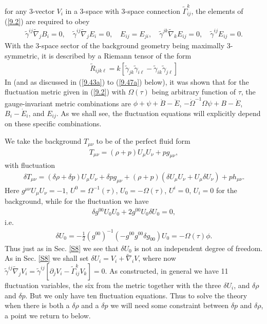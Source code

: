 \documentclass[aps,onecolumn,10pt]{revtex4}
\numberwithin{equation}{section}
\numberwithin{equation}{section}
\begin{document}
%
for any 3-vector $V_i$ in a 3-space with 3-space connection $\tilde{\Gamma}^{k}_{ij}$, the elements of (\ref{9.2}) are required to obey
%
\begin{eqnarray}
\tilde{\gamma}^{ij}\tilde{\nabla}_j B_i = 0,\quad \tilde{\gamma}^{ij}\tilde{\nabla}_j E_i = 0, \quad E_{ij}=E_{ji},\quad \tilde{\gamma}^{jk}\tilde{\nabla}_kE_{ij} = 0, \quad\tilde{\gamma}^{ij}E_{ij} = 0.
\label{9.4}
\end{eqnarray}
%
With the  3-space sector of the background geometry being maximally 3-symmetric, it is described by a Riemann tensor of the form
%
\begin{eqnarray}
\tilde{R}_{ijk\ell}=k[\tilde{\gamma}_{jk}\tilde{\gamma}_{i\ell}-\tilde{\gamma}_{ik}\tilde{\gamma}_{j\ell}]
\label{9.5}
\end{eqnarray}
%
In \cite{Amarasinghe2018} (and as discussed in (\ref{9.43a}) to (\ref{9.47a}) below), it was shown that for the fluctuation metric given in (\ref{9.2}) with $\Omega(\tau)$ being arbitrary function of $\tau$, the gauge-invariant metric combinations are $\phi + \psi + \dot B - \ddot E$, $ - \dot\Omega^{-1}\Omega \psi + B - \dot E$, $B_i-\dot{E}_i$, and $E_{ij}$. As we shall see, the fluctuation equations will explicitly depend on these specific combinations.



We take the background $T_{\mu\nu}$ to be of the perfect fluid form
%
\begin{eqnarray}
T_{\mu\nu}=(\rho+p)U_{\mu}U_{\nu}+pg_{\mu\nu},
\label{9.6}
\end{eqnarray}
%
with fluctuation
%
\begin{eqnarray}
\delta T_{\mu\nu}=(\delta\rho+\delta p)U_{\mu}U_{\nu}+\delta pg_{\mu\nu}+(\rho+p)(\delta U_{\mu}U_{\nu}+U_{\mu}\delta U_{\nu})+ph_{\mu\nu}.
\label{9.7}
\end{eqnarray}
%
Here  $g^{\mu\nu}U_{\mu}U_{\nu}=-1$, $U^{0}=\Omega^{-1}(\tau)$, $U_0=-\Omega(\tau)$, $U^{i}=0$, $U_i=0$ for the background, while for the fluctuation we have 
%
\begin{eqnarray}
 \delta g^{00}U_{0}U_{0}+2g^{00}U_{0}\delta U_{0}=0,
\label{9.8}
\end{eqnarray}
%
i.e. 
%
\begin{eqnarray}
\delta U_{0}=-\frac{1}{2}(g^{00})^{-1}(-g^{00}g^{00}\delta g_{00})U_{0}=-\Omega(\tau)\phi.
\label{9.9}
\end{eqnarray}
%
Thus just as in Sec. \ref{S8} we see that $\delta U_0$ is not an independent degree of freedom. As in Sec. \ref{S8} we shall set $\delta U_i=V_i+\tilde{\nabla}_iV$, where now $\tilde{\gamma}^{ij}\tilde{\nabla}_j V_i=\tilde{\gamma}^{ij}[\partial_j V_i-\tilde{\Gamma}^{k}_{ij}V_k]=0$. As constructed, in general we have 11 fluctuation variables, the six from the metric together with the three $\delta U_i$, and $\delta\rho$ and $\delta p$. But we only have ten fluctuation equations. Thus to solve the theory when there is both a $\delta \rho$ and a $\delta p$ we will need some constraint between $\delta p$ and $\delta \rho$, a point we return to below.
\end{document}
